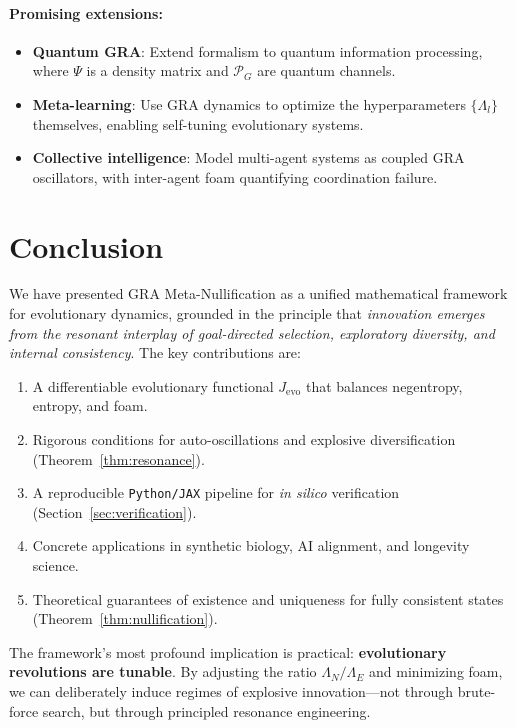 \documentclass[11pt,a4paper]{article}
\theoremstyle{plain}
\theoremstyle{definition}
\theoremstyle{remark}
\newcommand{\Projector}{\mathcal{P}}
\begin{document}
\paragraph{Promising extensions:}
\begin{itemize}
    \item \textbf{Quantum GRA}: Extend formalism to quantum information processing, where $\Psi$ is a density matrix and $\Projector_G$ are quantum channels.
    \item \textbf{Meta-learning}: Use GRA dynamics to optimize the hyperparameters $\{\Lambda_l\}$ themselves, enabling self-tuning evolutionary systems.
    \item \textbf{Collective intelligence}: Model multi-agent systems as coupled GRA oscillators, with inter-agent foam quantifying coordination failure.
\end{itemize}

\section{Conclusion}

We have presented GRA Meta-Nullification as a unified mathematical framework for evolutionary dynamics, grounded in the principle that \textit{innovation emerges from the resonant interplay of goal-directed selection, exploratory diversity, and internal consistency}. The key contributions are:

\begin{enumerate}
    \item A differentiable evolutionary functional $J_{\text{evo}}$ that balances negentropy, entropy, and foam.
    \item Rigorous conditions for auto-oscillations and explosive diversification (Theorem~\ref{thm:resonance}).
    \item A reproducible \texttt{Python/JAX} pipeline for \textit{in silico} verification (Section~\ref{sec:verification}).
    \item Concrete applications in synthetic biology, AI alignment, and longevity science.
    \item Theoretical guarantees of existence and uniqueness for fully consistent states (Theorem~\ref{thm:nullification}).
\end{enumerate}

The framework's most profound implication is practical: \textbf{evolutionary revolutions are tunable}. By adjusting the ratio $\Lambda_N/\Lambda_E$ and minimizing foam, we can deliberately induce regimes of explosive innovation---not through brute-force search, but through principled resonance engineering.
\end{document}
